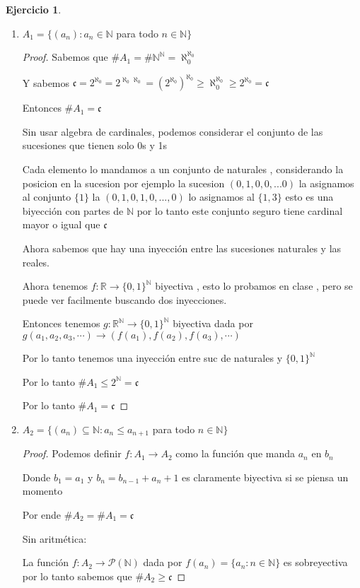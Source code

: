 \documentclass[12pt]{article}
\newcommand{\n}{\aleph_{0}}
\newcommand{\R}{\mathbb{R}}
\newcommand{\N}{\mathbb{N}}
\newcommand{\ra}{\rightarrow}
\theoremstyle{definition}
\newtheorem{ej}{Ejercicio}
\begin{document}
\begin{ej}
\begin{enumerate}
  \item $A_{1} = \{(a_{n}) : a_{n} \in \N $ para todo $ n \in \N\}$
    \begin{proof}
      Sabemos que $\# A_{1} = \# \N^{\N} = \n^{\n} $

      Y sabemos $ \mathfrak{c} = 2^{\n}= 2^{\n \n}  = (2^{\n})^{\n} \geq \n^{\n} \geq 2^{\n} = \mathfrak{c}$ 

      Entonces $\# A_{1} = \mathfrak{c}$

      Sin usar algebra de cardinales, podemos considerar el conjunto de las sucesiones que tienen solo 0s y 1s

      Cada elemento lo mandamos a un conjunto de naturales , considerando la posicion en la sucesion por ejemplo la sucesion $(0,1,0,0,...0)$ la asignamos al conjunto $\{1\}$ la $(0,1,0,1,0,...,0)$ lo asignamos al $\{1,3\}$ esto es una biyección con partes de $\N$ por lo tanto este conjunto seguro tiene cardinal mayor o igual que $\mathfrak{c}$

      Ahora sabemos que hay una inyección entre las sucesiones naturales y las reales.

      Ahora tenemos $f: \R \ra \{0,1\}^{\N}$ biyectiva , esto lo probamos en clase , pero se puede ver facilmente buscando dos inyecciones.

      Entonces tenemos $g: \R^{\N} \ra \{0,1\}^{\N}$ biyectiva dada por $g(a_1,a_2,a_3,\cdots) \ra (f(a_1),f(a_2),f(a_3),\cdots)$

      Por lo tanto tenemos una inyección entre suc de naturales y $\{0,1\}^{\N}$

      Por lo tanto $\# A_1 \leq 2^{\N} = \mathfrak{c}$

      Por lo tanto $\# A_1 = \mathfrak{c}$
    \end{proof}
  \item $A_{2} = \{(a_{n}) \subseteq \N : a_{n} \leq a_{n +1} $ para todo $ n \in \N \}$
    \begin{proof}
      Podemos definir $f:A_{1} \ra A_{2}$ como la función que manda $a_{n}$ en $b_{n}$ 
     
      Donde $b_{1} = a_{1}$ y $b_{n} = b_{n - 1} + a_{n} + 1$ es claramente biyectiva si se piensa un momento

      Por ende $\# A_{2} = \# A_{1} = \mathfrak{c}$

      Sin aritmética: 

      La función $f: A_2 \ra \mathcal{P}(\N)$ dada por $f(a_n) = \{a_n : n \in \N\}$ es sobreyectiva por lo tanto sabemos que $\# A_2 \geq \mathfrak{c}$


\end{proof}
\end{enumerate}
\end{ej}
\end{document}

